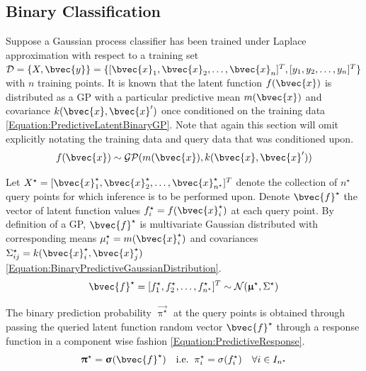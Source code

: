		\subsection{Binary Classification}
		\label{InformativeSeafloorExploration:MCPIE:Binary}
		
			Suppose a Gaussian process classifier has been trained under Laplace approximation with respect to a training set $\mathcal{D} = \{X, \bvec{y}\} = \{[ \bvec{x}_{1}, \bvec{x}_{2}, \dots, \bvec{x}_{n}]^{T}, [y_{1}, y_{2}, \dots, y_{n}]^{T}\}$ with $n$ training points. It is known that the latent function $f(\bvec{x})$ is distributed as a GP with a particular predictive mean $m(\bvec{x})$ and covariance $k(\bvec{x}, \bvec{x}')$ once conditioned on the training data \eqref{Equation:PredictiveLatentBinaryGP}. Note that again this section will omit explicitly notating the training data and query data that was conditioned upon. \begin{equation}
				f(\bvec{x}) \sim \mathcal{GP}(m(\bvec{x}), k(\bvec{x}, \bvec{x}'))
			\label{Equation:PredictiveLatentBinaryGP}
			\end{equation}
			
			Let $X^{\star} = [ \bvec{x}^{\star}_{1}, \bvec{x}^{\star}_{2}, \dots, \bvec{x}^{\star}_{n^{\star}}]^{T}$ denote the collection of $n^{\star}$ query points for which inference is to be performed upon. Denote $\bvec{f}^{\star}$ the vector of latent function values $f^{\star}_{i} = f(\bvec{x}^{\star}_{i})$ at each query point. By definition of a GP, $\bvec{f}^{\star}$ is multivariate Gaussian distributed with corresponding means $\mu^{\star}_{i} = m(\bvec{x}^{\star}_{i})$ and covariances $\Sigma^{\star}_{ij} = k(\bvec{x}^{\star}_{i}, \bvec{x}^{\star}_{j})$ \eqref{Equation:BinaryPredictiveGaussianDistribution}. \begin{equation}
				\bvec{f}^{\star} = [f^{\star}_{1}, f^{\star}_{2}, \dots, f^{\star}_{n^{\star}}]^{T} \sim \mathcal{N}(\vec{\upmu}^{\star}, \Sigma^{\star})
			\label{Equation:BinaryPredictiveGaussianDistribution}
			\end{equation}
				
			The binary prediction probability $\vec{\uppi^{\star}}$ at the query points is obtained through passing the queried latent function random vector $\bvec{f}^{\star}$ through a response function in a component wise fashion \eqref{Equation:PredictiveResponse}. \begin{equation}
				\vec{\uppi}^{\star} = \vec{\upsigma}(\bvec{f}^{\star})\mathrm{ \quad i.e. \;\;}\pi^{\star}_{i} = \sigma(f^{\star}_{i}) \quad \forall i \in I_{n^{\star}}
			\label{Equation:PredictiveResponse}
			\end{equation}
			

